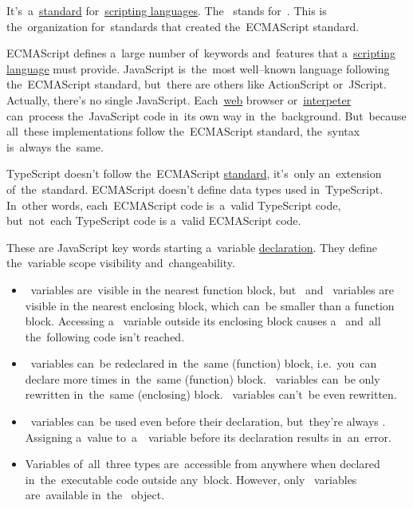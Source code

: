 \label{javascripts}

\label{ecmascript}
It's~a~\hyperref[protocolstandard]{standard} for~\hyperref[scriptinglanguages]{scripting languages}.
The~ stands for~.
This is the~organization for~standards that created the~ECMAScript standard.

ECMAScript defines a~large number of~keywords and~features that a~\hyperref[scriptinglanguages]{scripting language} must provide.
JavaScript is~the~most well--known language following the~ECMAScript standard, but~there are others like ActionScript or~JScript.
Actually, there's no single JavaScript.
Each~\hyperref[internetweb]{web} browser or~\hyperref[compiledinterpretedlanguages]{interpeter} can~process the~JavaScript code in~its own way in~the~background.
But~because all~these implementations follow the~ECMAScript standard, the~syntax is~always the~same.

\warning TypeScript doesn't follow the~ECMAScript \hyperref[protocolstandard]{standard}, it's~only an~extension of~the~standard.
ECMAScript doesn't define data types used in~TypeScript.
In~other words, each~ECMAScript code is~a~valid TypeScript code, but~not~each TypeScript code is a~valid ECMAScript code.

These are JavaScript key words starting a~variable \hyperref[declarationdefinition]{declaration}.
They define the~variable scope visibility and~changeability.

\begin{itemize}
    \item {}~variables are~visible in the nearest function block, but~ and~ variables are visible in the nearest enclosing block, which can~be smaller than a function block.
          Accessing a~ variable outside its enclosing block causes a~ and~all the~following code isn't reached.
    \item {}~variables can~be redeclared in~the~same (function) block, i.e.~you~can declare  more times in~the~same (function) block.
          ~variables can~be only rewritten in~the~same (enclosing) block.
          ~variables can't~be even rewritten.
    \item {}~variables can~be used even before their declaration, but~they're always .
          Assigning a~value to~a~~variable before its declaration results in~an~error.
    \item Variables of~all~three types are~accessible from anywhere when declared in~the~executable code outside any~block.
          However, only ~variables are~available in~the~ object.
\end{itemize}

